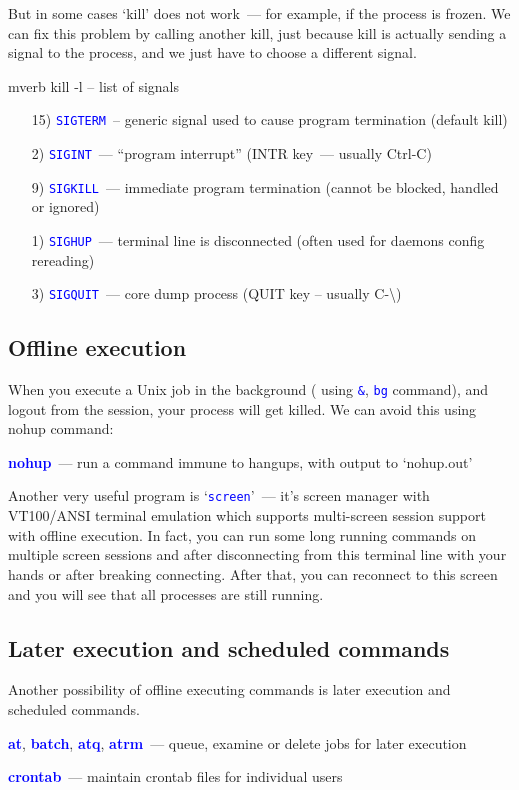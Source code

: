 \documentclass[12pt]{report}
\newcommand{\struct}[1]{\textcolor{blue}{#1}}
\newcommand{\cmd}[1]{\textcolor{blue}{\tt #1}}
\begin{document}
But in some cases `kill' does not work~--- for example, if the process is
frozen. We can fix this problem by calling another kill, just because
kill is actually sending a signal to the process, and we just have to
choose a different signal.
\begin{code}{mverb}
kill -l -- list of signals
\end{code}

\begin{itemize}
\item[15)] \cmd{SIGTERM}~-- generic signal used to cause program termination
(default kill)\\
\item[2)] \cmd{SIGINT}~--- ``program interrupt'' (INTR key~--- usually Ctrl-C)
\item[9)] \cmd{SIGKILL}~--- immediate program termination (cannot be blocked,
handled or ignored)
\item[1)] \cmd{SIGHUP}~--- terminal line is disconnected (often used for daemons
config rereading)
\item[3)] \cmd{SIGQUIT}~--- core dump process (QUIT key -- usually C-\textbackslash)
\end{itemize}

\subsection*{Offline execution}

When you execute a Unix job in the background ( using \cmd{\&}, \cmd{bg} command),
and logout from the session, your process will get killed.
We can avoid this using nohup command:

{\bf\struct{nohup}}~--- run a command immune to hangups,
with output to `nohup.out'

Another very useful program is `\cmd{screen}'~--- it's screen manager with
VT100/ANSI terminal emulation which supports multi-screen session support
with offline execution. In fact, you can run some long running commands
on multiple screen sessions and after disconnecting from this terminal
line with your hands or after breaking connecting. After that, you can
reconnect to this screen and you will see that all processes are still running.

\subsection*{Later execution and scheduled commands}

Another possibility of offline executing commands is later execution and
scheduled commands.

{\bf\struct{at}}, {\bf\struct{batch}}, {\bf\struct{atq}}, {\bf\struct{atrm}}~---
queue, examine or delete jobs for later execution

{\bf\struct{crontab}}~--- maintain crontab files for individual users
\end{document}
